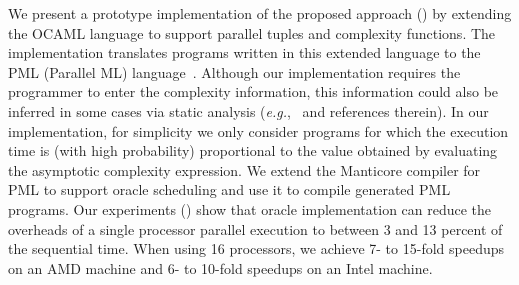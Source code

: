 We present a prototype implementation of the proposed approach
() by extending the OCAML language to support parallel
tuples and complexity functions.  The implementation translates
programs written in this extended language to the PML (Parallel ML)
language~\cite{FluetRaReSh11}.  Although our implementation requires
the programmer to enter the complexity information, this information
could also be inferred in some cases via static analysis
(\textit{e.g.},~\cite{JostHaLoHo10} and references therein).  In our
implementation, for simplicity we only consider programs for which the
execution time is (with high probability) proportional to the value
obtained by evaluating the asymptotic complexity expression.  We
extend the Manticore compiler for PML to support oracle scheduling and
use it to compile generated PML programs.  Our experiments
() show that oracle implementation can reduce the
overheads of a single processor parallel execution to between 3 and 13
percent of the sequential time.
When using 16 processors, we achieve 7- to 15-fold speedups
on an AMD machine and 6- to 10-fold speedups on an Intel machine.


